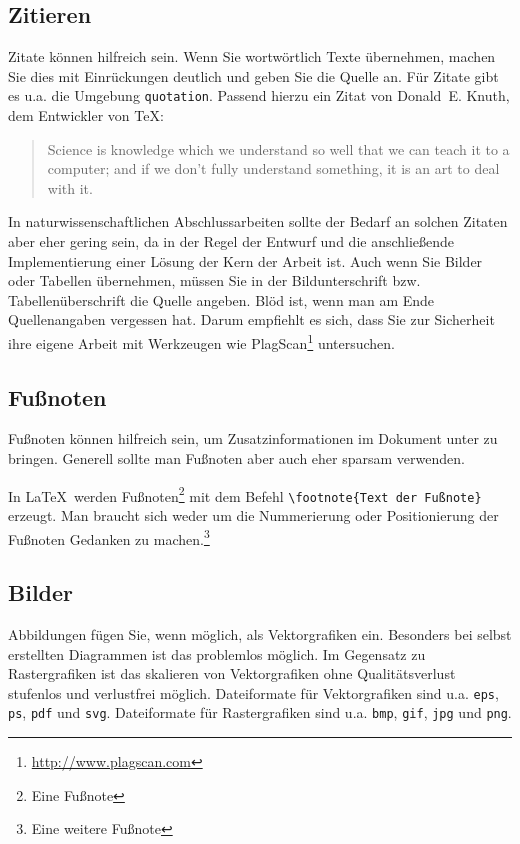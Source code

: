 \documentclass{llncs}
\begin{document}
\subsection{Zitieren}

Zitate können hilfreich sein. Wenn Sie wortwörtlich Texte übernehmen, machen Sie dies mit Einrückungen deutlich und geben Sie die Quelle an. Für Zitate gibt es u.a. die Umgebung \texttt{quotation}. Passend hierzu ein Zitat von Donald~E. Knuth, dem Entwickler von \TeX:

\begin{quotation}
Science is knowledge which we understand so well that we can teach it to a computer; and if we don't fully understand something, it is an art to deal with it.~\cite{Knuth1974}
\end{quotation}


In naturwissenschaftlichen Abschlussarbeiten sollte der Bedarf an solchen Zitaten aber eher gering sein, da in der Regel der Entwurf und die anschließende Implementierung einer Lösung der Kern der Arbeit ist. Auch wenn Sie Bilder oder Tabellen übernehmen, müssen Sie in der Bildunterschrift bzw. Tabellenüberschrift die Quelle angeben. Blöd ist, wenn man am Ende Quellenangaben vergessen hat. Darum empfiehlt es sich, dass Sie zur Sicherheit ihre eigene Arbeit mit Werkzeugen wie PlagScan\footnote{\url{http://www.plagscan.com}} untersuchen.




\subsection{Fußnoten}

Fußnoten können hilfreich sein, um Zusatzinformationen im Dokument unter zu bringen. Generell sollte man Fußnoten aber auch eher sparsam verwenden.

In \LaTeX\ werden Fußnoten\footnote{Eine Fußnote} mit dem Befehl \verb!\footnote{Text der Fußnote}! erzeugt. Man braucht sich weder um die Nummerierung oder Positionierung der Fußnoten Gedanken zu machen.\footnote{Eine weitere Fußnote}

\subsection{Bilder}

Abbildungen fügen Sie, wenn möglich, als Vektorgrafiken ein. Besonders bei selbst erstellten Diagrammen ist das problemlos möglich. Im Gegensatz zu Rastergrafiken ist das skalieren von Vektorgrafiken ohne Qualitätsverlust stufenlos und verlustfrei möglich. Dateiformate für Vektorgrafiken sind u.a. \verb!eps!, \verb!ps!, \verb!pdf! und \verb!svg!. Dateiformate für Rastergrafiken sind u.a. \verb!bmp!, \verb!gif!, \verb!jpg! und \verb!png!.
\end{document}
